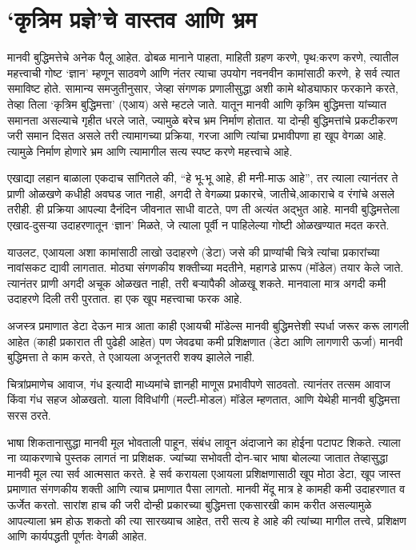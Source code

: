 \chapter{`कृत्रिम प्रज्ञे'चे वास्तव आणि भ्रम}

मानवी बुद्धिमत्तेचे अनेक पैलू आहेत. ढोबळ मानाने पाहता, माहिती ग्रहण करणे, पृथ:करण करणे, त्यातील महत्त्वाची गोष्ट `ज्ञान' म्हणून साठवणे आणि नंतर त्याचा उपयोग नवनवीन कामांसाठी करणे, हे सर्व त्यात समाविष्ट होते. सामान्य समजुतीनुसार, जेव्हा संगणक प्रणालीसुद्धा अशी कामे थोड्याफार फरकाने करते, तेव्हा तिला `कृत्रिम बुद्धिमत्ता' (एआय) असे म्हटले जाते. यातून मानवी आणि कृत्रिम बुद्धिमत्ता यांच्यात समानता असल्याचे गृहीत धरले जाते, ज्यामुळे बरेच भ्रम निर्माण होतात. या दोन्ही बुद्धिमत्तांचे प्रकटीकरण जरी समान दिसत असले तरी त्यामागच्या प्रक्रिया, गरजा आणि त्यांचा प्रभावीपणा हा खूप वेगळा आहे. त्यामुळे निर्माण होणारे भ्रम आणि त्यामागील सत्य स्पष्ट करणे महत्त्वाचे आहे.

एखाद्या लहान बाळाला एकदाच सांगितले की, ``हे भू-भू आहे, ही मनी-माऊ आहे'', तर त्याला त्यानंतर ते प्राणी ओळखणे कधीही अवघड जात नाही, अगदी ते वेगळ्या प्रकारचे, जातीचे,आकाराचे व रंगांचे असले तरीही. ही प्रक्रिया आपल्या दैनंदिन जीवनात साधी वाटते, पण ती अत्यंत अद्भुत आहे. मानवी बुद्धिमत्तेला एखाद-दुसऱ्या उदाहरणातून `ज्ञान' मिळते, जे त्याला पूर्वी न पाहिलेल्या गोष्टी ओळखण्यात मदत करते.

याउलट, एआयला अशा कामांसाठी लाखो उदाहरणे (डेटा) जसे की प्राण्यांची चित्रे त्यांचा प्रकारांच्या नावांसकट द्यावी लागतात. मोठ्या संगणकीय शक्तीच्या मदतीने, महागडे प्रारूप (मॉडेल) तयार केले जाते. त्यानंतर प्राणी अगदी अचूक ओळखत नाही, तरी बऱ्यापैकी ओळखू शकते. मानवाला मात्र अगदी कमी उदाहरणे दिली तरी पुरतात. हा एक खूप महत्त्वाचा फरक आहे. 

अजस्त्र प्रमाणात डेटा देऊन मात्र आता काही एआयची मॉडेल्स मानवी बुद्धिमत्तेशी स्पर्धा जरूर करू लागली आहेत (काही प्रकारात ती पुढेही आहेत) पण जेवढ्या कमी प्रशिक्षणात (डेटा आणि लागणारी ऊर्जा) मानवी बुद्धिमत्ता ते काम करते, ते एआयला अजूनतरी शक्य झालेले नाही. 

चित्रांप्रमाणेच आवाज, गंध इत्यादी माध्यमांचे ज्ञानही माणूस प्रभावीपणे साठवतो. त्यानंतर तत्सम आवाज किंवा गंध सहज ओळखतो. याला विविधांगी (मल्टी-मोडल) मॉडेल म्हणतात, आणि येथेही मानवी बुद्धिमत्ता सरस ठरते.

भाषा शिकतानासुद्धा मानवी मूल भोवताली पाहून, संबंध लावून अंदाजाने का होईना पटापट शिकते. त्याला ना व्याकरणाचे पुस्तक लागतं ना प्रशिक्षक. ज्यांच्या सभोवती दोन-चार भाषा बोलल्या जातात तेव्हासुद्धा मानवी मूल त्या सर्व आत्मसात करते. हे सर्व करायला एआयला प्रशिक्षणासाठी खूप मोठा डेटा, खूप जास्त प्रमाणात संगणकीय शक्ती आणि त्याच प्रमाणात पैसा लागतो. मानवी मेंदू मात्र हे कामही कमी उदाहरणात व ऊर्जेत करतो. सारांश हाच की  जरी दोन्ही प्रकारच्या बुद्धिमत्ता एकसारखी काम करीत असल्यामुळे आपल्याला भ्रम होऊ शकतो की त्या सारख्याच आहेत, तरी सत्य हे आहे की त्यांच्या मागील तत्त्वे, प्रशिक्षण आणि कार्यपद्धती पूर्णतः वेगळी आहेत. 

